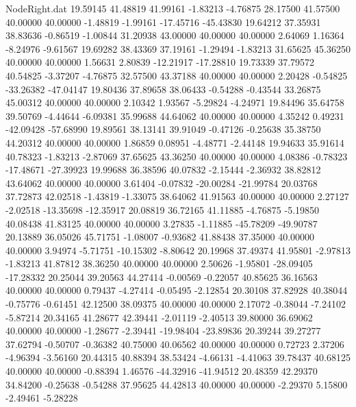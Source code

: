 \begin{filecontents}{NodeRight.dat}
  19.59145   41.48819   41.99161    -1.83213   -4.76875   28.17500   41.57500   40.00000   40.00000   -1.48819   -1.99161  -17.45716  -45.43830
  19.64212   37.35931   38.83636    -0.86519   -1.00844   31.20938   43.00000   40.00000   40.00000    2.64069    1.16364   -8.24976   -9.61567
  19.69282   38.43369   37.19161    -1.29494   -1.83213   31.65625   45.36250   40.00000   40.00000    1.56631    2.80839  -12.21917  -17.28810
  19.73339   37.79572   40.54825    -3.37207   -4.76875   32.57500   43.37188   40.00000   40.00000    2.20428   -0.54825  -33.26382  -47.04147
  19.80436   37.89658   38.06433    -0.54288   -0.43544   33.26875   45.00312   40.00000   40.00000    2.10342    1.93567   -5.29824   -4.24971
  19.84496   35.64758   39.50769    -4.44644   -6.09381   35.99688   44.64062   40.00000   40.00000    4.35242    0.49231  -42.09428  -57.68990
  19.89561   38.13141   39.91049    -0.47126   -0.25638   35.38750   44.20312   40.00000   40.00000    1.86859    0.08951   -4.48771   -2.44148
  19.94633   35.91614   40.78323    -1.83213   -2.87069   37.65625   43.36250   40.00000   40.00000    4.08386   -0.78323  -17.48671  -27.39923
  19.99688   36.38596   40.07832    -2.15444   -2.36932   38.82812   43.64062   40.00000   40.00000    3.61404   -0.07832  -20.00284  -21.99784
  20.03768   37.72873   42.02518    -1.43819   -1.33075   38.64062   41.91563   40.00000   40.00000    2.27127   -2.02518  -13.35698  -12.35917
  20.08819   36.72165   41.11885    -4.76875   -5.19850   40.08438   41.83125   40.00000   40.00000    3.27835   -1.11885  -45.78209  -49.90787
  20.13889   36.05026   45.71751    -1.08007   -0.93682   41.88438   37.35000   40.00000   40.00000    3.94974   -5.71751  -10.15302   -8.80642
  20.19968   37.49374   41.95801    -2.97813   -1.83213   41.87812   38.36250   40.00000   40.00000    2.50626   -1.95801  -28.09405  -17.28332
  20.25044   39.20563   44.27414    -0.00569   -0.22057   40.85625   36.16563   40.00000   40.00000    0.79437   -4.27414   -0.05495   -2.12854
  20.30108   37.82928   40.38044    -0.75776   -0.61451   42.12500   38.09375   40.00000   40.00000    2.17072   -0.38044   -7.24102   -5.87214
  20.34165   41.28677   42.39441    -2.01119   -2.40513   39.80000   36.69062   40.00000   40.00000   -1.28677   -2.39441  -19.98404  -23.89836
  20.39244   39.27277   37.62794    -0.50707   -0.36382   40.75000   40.06562   40.00000   40.00000    0.72723    2.37206   -4.96394   -3.56160
  20.44315   40.88394   38.53424    -4.66131   -4.41063   39.78437   40.68125   40.00000   40.00000   -0.88394    1.46576  -44.32916  -41.94512
  20.48359   42.29370   34.84200    -0.25638   -0.54288   37.95625   44.42813   40.00000   40.00000   -2.29370    5.15800   -2.49461   -5.28228

\end{filecontents}
